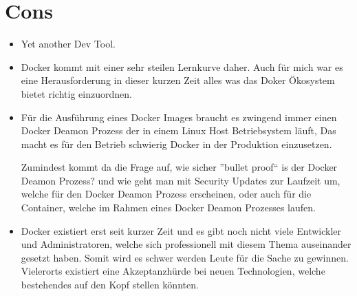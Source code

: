 \section{Cons}

\begin{itemize}

\item Yet another Dev Tool.

\item Docker kommt mit einer sehr steilen Lernkurve daher. Auch für mich war es eine Herausforderung
in dieser kurzen Zeit alles was das Doker Ökosystem bietet richtig einzuordnen.

\item Für die Ausführung eines Docker Images braucht es zwingend immer einen Docker Deamon Prozess der
in einem Linux Host Betriebsystem läuft, Das macht es für den Betrieb schwierig Docker in der
Produktion einzusetzen.

Zumindest kommt da die Frage auf, wie sicher ”bullet proof“ is der Docker Deamon Prozess? und wie
geht man mit Security Updates zur Laufzeit um, welche für den Docker Deamon Prozess erscheinen,
oder auch für die Container, welche im Rahmen eines Docker Deamon Prozesses laufen.

\item Docker existiert erst seit kurzer Zeit und es gibt noch nicht viele Entwickler und
Administratoren, welche sich professionell mit diesem Thema auseinander gesetzt haben. Somit wird
es schwer werden Leute für die Sache zu gewinnen. Vielerorts existiert eine Akzeptanzhürde bei
neuen Technologien, welche bestehendes auf den Kopf stellen könnten.

\end{itemize}